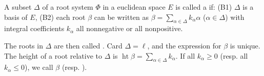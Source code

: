A subset $\Delta$ of a root system $\Phi$ in a euclidean space $E$ is called a  if:
(B1) $\Delta$ is a basis of $E$,
(B2) each root $\beta$ can be written as $\beta = \sum_{\alpha \in \Delta} k_\alpha \alpha$ ($\alpha \in \Delta$) with integral coefficients $k_\alpha$ all nonnegative or all nonpositive.

The roots in $\Delta$ are then called . Card $\Delta = \ell$, and the expression for $\beta$ is unique. The height of a root relative to $\Delta$ is $\operatorname{ht} \beta = \sum_{\alpha \in \Delta} k_\alpha$. If all $k_\alpha \geq 0$ (resp. all $k_\alpha \leq 0$), we call $\beta$  (resp. ).